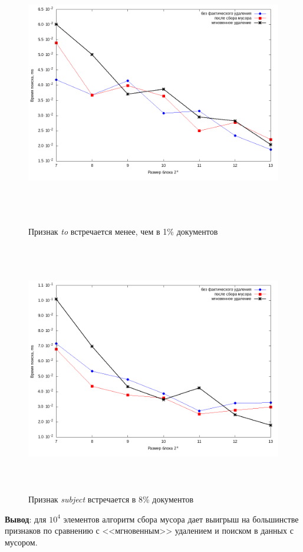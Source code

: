 \begin{figure}[H]
\includegraphics[width=\linewidth, height=11cm]{fig/limit_1/1e4/to.png}
\caption{Признак \textit{to} встречается менее, чем в 1\% документов}
\includegraphics[width=\linewidth, height=11cm]{fig/limit_1/1e4/subject.png}
\caption{Признак \textit{subject} встречается в 8\% документов}
\end{figure}

\textbf{Вывод}: для $10^4$ элементов алгоритм сбора мусора дает выигрыш на большинстве признаков
по сравнению с <<мгновенным>> удалением и поиском в данных с мусором.

